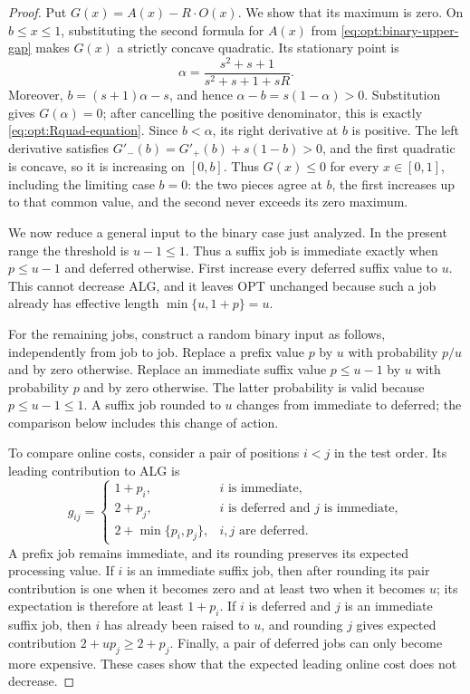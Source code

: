 \begin{proof}
Put $G(x)=A(x)-R\cdot O(x)$.  We show that its maximum is zero.
On $b\le x\le1$, substituting the second formula for $A(x)$ from
\cref{eq:opt:binary-upper-gap} makes $G(x)$ a strictly concave quadratic.
Its stationary point is
\[
 \alpha=\frac{s^2+s+1}{s^2+s+1+sR}.
\]
Moreover, $b=(s+1)\alpha-s$, and hence
$\alpha-b=s(1-\alpha)>0$.  Substitution gives $G(\alpha)=0$; after
cancelling the positive denominator, this is exactly
\cref{eq:opt:Rquad-equation}.  Since $b<\alpha$, its right derivative at $b$
is positive.  The left derivative satisfies
$G'_-(b)=G'_+(b)+s(1-b)>0$, and the first quadratic is concave, so it is
increasing on $[0,b]$.  Thus $G(x)\le0$ for every $x\in[0,1]$, including
the limiting case $b=0$: the two pieces agree at $b$, the first increases
up to that common value, and the second never exceeds its zero maximum.

We now reduce a general input to the binary case just analyzed.  In the
present range the threshold is $u-1\le1$.  Thus a suffix job is immediate
exactly when $p\le u-1$ and deferred otherwise.  First increase every
deferred suffix value to $u$.  This cannot decrease ALG, and it leaves OPT
unchanged because such a job already has effective length
$\min\{u,1+p\}=u$.

For the remaining jobs, construct a random binary input as follows,
independently from job to job.  Replace a prefix value $p$ by $u$ with
probability $p/u$ and by zero otherwise.  Replace an immediate suffix value
$p\le u-1$ by $u$ with probability $p$ and by zero otherwise.  The latter
probability is valid because $p\le u-1\le1$.  A suffix job rounded to $u$
changes from immediate to deferred; the comparison below includes this
change of action.

To compare online costs, consider a pair of positions $i<j$ in the test
order.  Its leading contribution to ALG is
\begin{equation}
 g_{ij}=\begin{cases}
 1+p_i,&i\text{ is immediate},\\
 2+p_j,&i\text{ is deferred and }j\text{ is immediate},\\
 2+\min\{p_i,p_j\},&i,j\text{ are deferred}.
 \end{cases}
 \label{eq:opt:pair-contribution}
\end{equation}
A prefix job remains immediate, and its rounding preserves its expected
processing value.  If $i$ is an immediate suffix job, then after rounding its
pair contribution is one when it becomes zero and at least two when it
becomes $u$; its expectation is therefore at least $1+p_i$.  If $i$ is
deferred and $j$ is an immediate suffix job, then $i$ has already been raised
to $u$, and rounding $j$ gives expected contribution
$2+up_j\ge2+p_j$.  Finally, a pair of deferred jobs can only become more
expensive.  These cases show that the expected leading online cost does not
decrease.


\end{proof}
